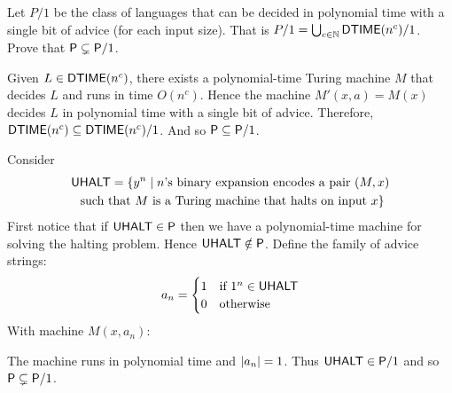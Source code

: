 \begin{question}
Let $P/1$ be the class of languages that can be decided in 
polynomial time with a single bit of advice
(for each input size). That is $P/1 =
\bigcup_{c\in\mathbb{N}} \mathsf{DTIME}(n^c)/1$. Prove that $\mathsf{P} \subsetneq \mathsf{P}/1$.
\begin{answer}
    Given $L\in\mathsf{DTIME}(n^c)$, there exists a polynomial-time Turing machine $M$
    that decides $L$ and runs in time $O(n^c)$.
    Hence the machine $M'(x,a)=M(x)$ decides $L$ in polynomial time with a single bit of advice.
    Therefore, $\mathsf{DTIME}(n^c)\subseteq \mathsf{DTIME}(n^c)/1$.
    And so $\mathsf{P}\subseteq \mathsf{P}/1$.
    \par Consider
\begin{gather*}
    \mathsf{UHALT}=\{y^n\mid n\text{'s binary expansion encodes a pair }(M,x)
    \\
    \text{ such that }M\text{ is a Turing machine that halts on input }x\}    
\end{gather*}
First notice that if $\mathsf{UHALT}\in \mathsf{P}$ then
we have a polynomial-time machine for solving the halting problem.
Hence $\mathsf{UHALT}\notin \mathsf{P}$.
Define the family of advice strings:
\begin{gather*}
    a_n=\begin{cases}
        1 & \text{if }1^n\in \mathsf{UHALT}
        \\
        0 & \text{otherwise}
    \end{cases}
\end{gather*}
With machine $M(x,a_n)$:
\begin{algorithmic}
            \State {}
        \Else
            \State {}
        \EndIf
    \Else
        \State {}
    \EndIf
\end{algorithmic}
\end{answer}
The machine runs in polynomial time and $\lvert a_n\rvert=1$.
Thus $\mathsf{UHALT}\in \mathsf{P}/1$ and so $\mathsf{P}\subsetneq\mathsf{P}/1$.
\end{question}